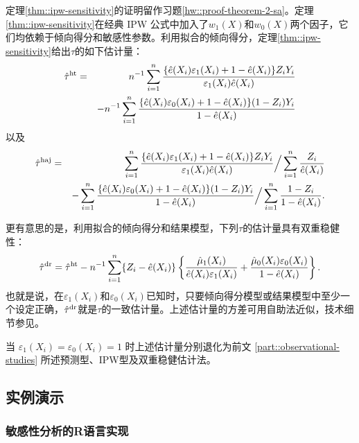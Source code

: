 定理\ref{thm::ipw-sensitivity}的证明留作习题\ref{hw::proof-theorem-2-sa}。定理\ref{thm::ipw-sensitivity}在经典 IPW 公式中加入了$w_1(X) $和$w_0(X) $两个因子，它们均依赖于倾向得分和敏感性参数。利用拟合的倾向得分，定理\ref{thm::ipw-sensitivity}给出$\tau$的如下估计量：
\begin{eqnarray*} 
\hat\tau^{\textup{ht}} &=&  n^{-1} \sum_{i=1}^n \frac{ \{ \hat{e}(X_i)\varepsilon_1(X_i) + 1-\hat{e}(X_i) \} Z_iY_i     }{  \varepsilon_1(X_i)  \hat e(X_i)  } \\
&&- n^{-1} \sum_{i=1}^n  \frac{ \{  \hat e(X_i)  \varepsilon_0(X_i) + 1- \hat e(X_i)  \} (1-Z_i) Y_i }{ 1- \hat e(X_i)} 
\end{eqnarray*}
以及
\begin{eqnarray*} 
\hat\tau^{\textup{haj}} &=&   \sum_{i=1}^n \frac{ \{ \hat{e}(X_i)\varepsilon_1(X_i) + 1-\hat{e}(X_i) \} Z_iY_i     }{  \varepsilon_1(X_i)  \hat  e(X_i)  }  \Big / \sum_{i=1}^n \frac{Z_i}{ \hat{e}(X_i)  }   \\
&&- \sum_{i=1}^n  \frac{ \{  \hat  e(X_i)  \varepsilon_0(X_i) + 1- \hat e(X_i)  \} (1-Z_i) Y_i }{ 1- \hat e(X_i)} \Big / \sum_{i=1}^n \frac{1-Z_i}{ 1- \hat{e}(X_i)  } .
\end{eqnarray*}





更有意思的是，利用拟合的倾向得分和结果模型，下列$\tau$的估计量具有双重稳健性：
\begin{eqnarray*}
\hat{\tau}^{\textup{dr}} = \hat\tau^{\textup{ht}}
- n^{-1} \sum_{i=1}^n \{Z_i- \hat e(X_i)\}  \left\{   \frac{  \hat  \mu_1(X_i) }{  \hat e(X_i) \varepsilon_1(X_i)  }    + \frac{  \hat  \mu_0(X_i)\varepsilon_0(X_i)  }{ 1-  \hat  e(X_i) } \right\}.
\end{eqnarray*}
也就是说，在$\varepsilon_1(X_i) $和$\varepsilon_0(X_i) $已知时，只要倾向得分模型或结果模型中至少一个设定正确，$\hat{\tau}^{\textup{dr}} $就是$\tau$的一致估计量。上述估计量的方差可用自助法近似，技术细节参见\citet{luding2023flexible}。 




当 $\varepsilon_1(X_i)  =  \varepsilon_0(X_i) = 1$ 时上述估计量分别退化为前文 \ref{part::observational-studies} 所述预测型、IPW型及双重稳健估计法。 



\subsection{实例演示}
\label{sec::eg-sensitivity-tau}


\subsubsection{敏感性分析的R语言实现}


